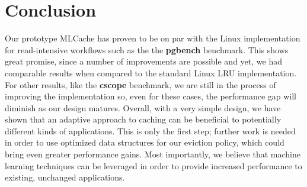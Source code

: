 \section{Conclusion}

Our prototype MLCache has proven to be on par with the Linux implementation for
read-intensive workflows such as the the \textbf{pgbench} benchmark. This shows
great promise, since a number of improvements are possible and yet, we had
comparable results when compared to the standard Linux LRU implementation. For
other results, like the \textbf{cscope} benchmark, we are still in the process
of improving the implementation so, even for these cases, the performance gap
will diminish as our design matures. Overall, with a very simple design, we
have shown that an adaptive approach to caching can be beneficial to
potentially different kinds of applications. This is only the first step;
further work is needed in order to use optimized data structures for our
eviction policy, which could bring even greater performance gains.
Most importantly, we believe that machine learning techniques
can be leveraged in order to provide increased performance to existing,
unchanged applications.
